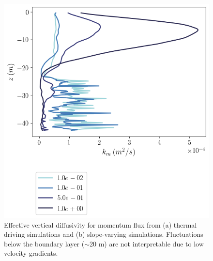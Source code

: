\documentclass[draft,jgrga]{agutexSI2019}
\begin{document}
\begin{figure}[]
\begin{minipage}{0.5\textwidth}
        \includegraphics[trim={0 4.5cm 0 0},clip, width=\textwidth]{Figures/km_cmp_slope_46h_tav12_z_profile.png}
    \end{minipage}
    \caption{Effective vertical diffusivity for momentum flux from (a) thermal driving simulations and (b) slope-varying simulations. Fluctuations below the boundary layer ($\sim$20 m) are not interpretable due to low velocity gradients. }
    \label{fig:km}
\end{figure}
\end{document}
